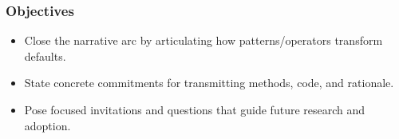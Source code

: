 \subsubsection{Objectives}
\begin{itemize}[noitemsep]
	\item Close the narrative arc by articulating how patterns/operators transform defaults.
	\item State concrete commitments for transmitting methods, code, and rationale.
	\item Pose focused invitations and questions that guide future research and adoption.
\end{itemize}

